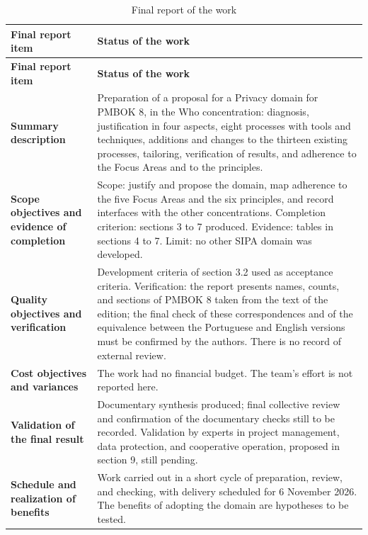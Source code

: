 \documentclass[12pt,a4paper,article,oneside,brazil,english]{abntex2}
\begin{document}
\begingroup\SingleSpacing\small
\begin{longtable}{@{}>{\raggedright\arraybackslash}p{}>{\raggedright\arraybackslash}p{}@{}}
\caption{Final report of the work}\label{tab:t12}\\
\hline
\textbf{Final report item} & \textbf{Status of the work}\\
\hline
\endfirsthead
\hline
\textbf{Final report item} & \textbf{Status of the work}\\
\hline
\endhead
\hline
\endfoot
\hline
\endlastfoot
\textbf{Summary description} & Preparation of a proposal for a Privacy domain for PMBOK 8, in the Who concentration: diagnosis, justification in four aspects, eight processes with tools and techniques, additions and changes to the thirteen existing processes, tailoring, verification of results, and adherence to the Focus Areas and to the principles.\\[3pt]
\textbf{Scope objectives and evidence of completion} & Scope: justify and propose the domain, map adherence to the five Focus Areas and the six principles, and record interfaces with the other concentrations. Completion criterion: sections 3 to 7 produced. Evidence: tables in sections 4 to 7. Limit: no other SIPA domain was developed.\\[3pt]
\textbf{Quality objectives and verification} & Development criteria of section 3.2 used as acceptance criteria. Verification: the report presents names, counts, and sections of PMBOK 8 taken from the text of the edition; the final check of these correspondences and of the equivalence between the Portuguese and English versions must be confirmed by the authors. There is no record of external review.\\[3pt]
\textbf{Cost objectives and variances} & The work had no financial budget. The team's effort is not reported here.\\[3pt]
\textbf{Validation of the final result} & Documentary synthesis produced; final collective review and confirmation of the documentary checks still to be recorded. Validation by experts in project management, data protection, and cooperative operation, proposed in section 9, still pending.\\[3pt]
\textbf{Schedule and realization of benefits} & Work carried out in a short cycle of preparation, review, and checking, with delivery scheduled for 6 November 2026. The benefits of adopting the domain are hypotheses to be tested.\\[3pt]

\end{longtable}
\end{document}
